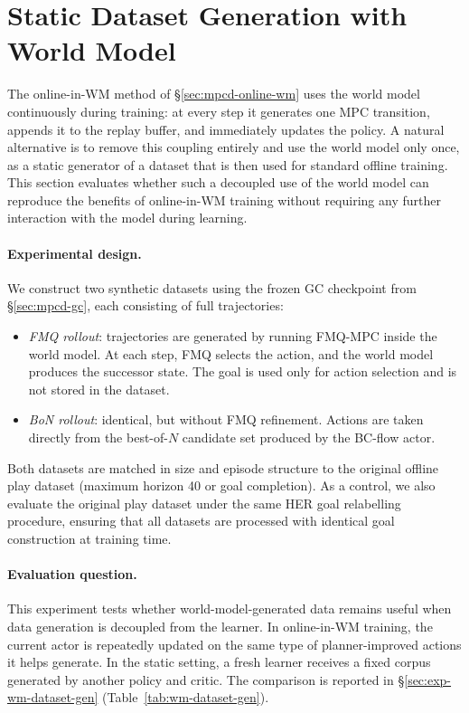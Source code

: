 \section{Static Dataset Generation with World Model}
\label{sec:mpcd-dataset-gen}

The online-in-WM method of \S\ref{sec:mpcd-online-wm} uses the world
model continuously during training: at every step it generates one MPC
transition, appends it to the replay buffer, and immediately updates
the policy. A natural alternative is to remove this coupling entirely
and use the world model only once, as a static generator of a dataset
that is then used for standard offline training.
This section evaluates whether such a decoupled use of the world model
can reproduce the benefits of online-in-WM training without requiring
any further interaction with the model during learning.

\paragraph{Experimental design.}
We construct two synthetic datasets using the frozen GC checkpoint from
\S\ref{sec:mpcd-gc}, each consisting of full trajectories:

\begin{itemize}
    \item \emph{FMQ rollout}: trajectories are generated by running
    FMQ-MPC inside the world model. At each step, FMQ selects the
    action, and the world model produces the successor state. The goal
    is used only for action selection and is not stored in the dataset.

    \item \emph{BoN rollout}: identical, but without FMQ refinement.
    Actions are taken directly from the best-of-$N$ candidate set
    produced by the BC-flow actor.
\end{itemize}

Both datasets are matched in size and episode structure to the original
offline play dataset (maximum horizon 40 or goal completion). As a
control, we also evaluate the original play dataset under the same HER
goal relabelling procedure, ensuring that all datasets are processed
with identical goal construction at training time.

\paragraph{Evaluation question.}
This experiment tests whether world-model-generated data remains useful
when data generation is decoupled from the learner. In online-in-WM
training, the current actor is repeatedly updated on the same type of
planner-improved actions it helps generate. In the static setting, a
fresh learner receives a fixed corpus generated by another policy and
critic. The comparison is reported in \S\ref{sec:exp-wm-dataset-gen}
(Table~\ref{tab:wm-dataset-gen}).
